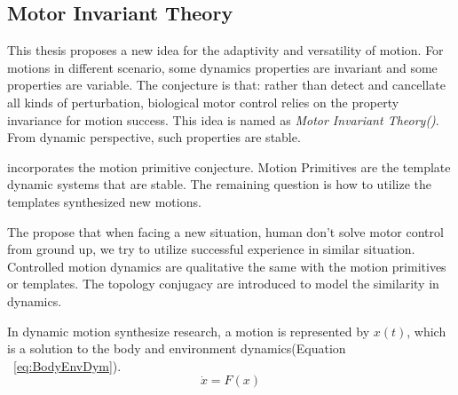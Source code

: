 \subsection{Motor Invariant Theory}
%
%
%





This thesis proposes a new idea for the adaptivity and versatility of motion.
For motions in different scenario, some dynamics properties are invariant and some properties are variable.
The conjecture is that: rather than detect and cancellate all kinds of perturbation, biological motor control relies on the property invariance for motion success.
This idea is named as \emph{Motor Invariant Theory(\moit)}.
From dynamic perspective, such properties are stable.

\moit incorporates the motion primitive conjecture. 
Motion Primitives are the template dynamic systems that are stable.
The remaining question is how to utilize the templates synthesized new motions.

The \moit propose that when facing a new situation, human don't solve motor control from ground up,
we try to utilize  successful experience in similar situation.
Controlled motion dynamics are qualitative the same with the motion primitives or templates.
The topology conjugacy are introduced to model the similarity in dynamics.

In dynamic motion synthesize research, a motion is represented by $x(t)$, which is a solution to the body and environment dynamics(Equation ~\ref{eq:BodyEnvDym}).
\begin{equation}
\dot{x}=F(x)
\label{eq:BodyEnvDym}
\end{equation}


